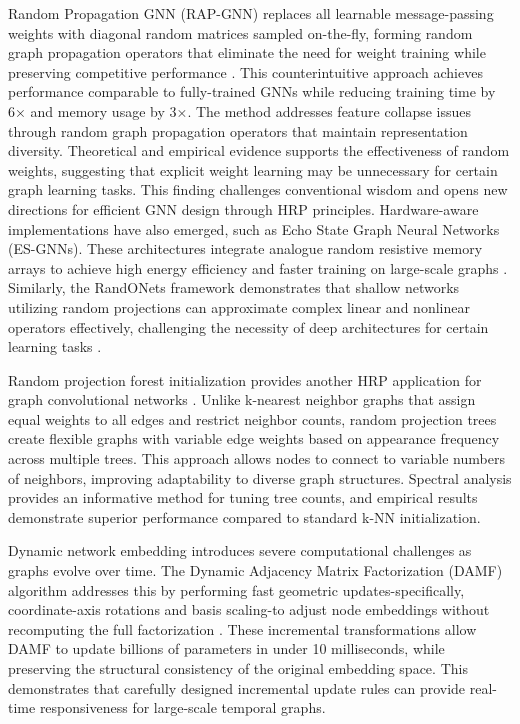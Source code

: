 \documentclass[conference]{IEEEtran}
\begin{document}
Random Propagation GNN (RAP-GNN) replaces all learnable message-passing weights with diagonal random matrices sampled on-the-fly, forming random graph propagation operators that eliminate the need for weight training while preserving competitive performance \cite{bui2023rap}.
This counterintuitive approach achieves performance comparable to fully-trained GNNs while reducing training time by 6× and memory usage by 3×. The method addresses feature collapse issues through random graph propagation operators that maintain representation diversity. Theoretical and empirical evidence supports the effectiveness of random weights, suggesting that explicit weight learning may be unnecessary for certain graph learning tasks. This finding challenges conventional wisdom and opens new directions for efficient GNN design through HRP principles. Hardware-aware implementations have also emerged, such as Echo State Graph Neural Networks (ES-GNNs). These architectures integrate analogue random resistive memory arrays to achieve high energy efficiency and faster training on large-scale graphs \cite{wang2023echo}. Similarly, the RandONets framework demonstrates that shallow networks utilizing random projections can approximate complex linear and nonlinear operators effectively, challenging the necessity of deep architectures for certain learning tasks \cite{fabiani2023randonets}.

Random projection forest initialization provides another HRP application for graph convolutional networks \cite{alshammari2020rpforest}. Unlike k-nearest neighbor graphs that assign equal weights to all edges and restrict neighbor counts, random projection trees create flexible graphs with variable edge weights based on appearance frequency across multiple trees. This approach allows nodes to connect to variable numbers of neighbors, improving adaptability to diverse graph structures. Spectral analysis provides an informative method for tuning tree counts, and empirical results demonstrate superior performance compared to standard k-NN initialization.

Dynamic network embedding introduces severe computational challenges as graphs evolve over time. The Dynamic Adjacency Matrix Factorization (DAMF) algorithm addresses this by performing fast geometric updates-specifically, coordinate-axis rotations and basis scaling-to adjust node embeddings without recomputing the full factorization \cite{deng2023damf}. These incremental transformations allow DAMF to update billions of parameters in under 10 milliseconds, while preserving the structural consistency of the original embedding space. This demonstrates that carefully designed incremental update rules can provide real-time responsiveness for large-scale temporal graphs.
\end{document}
